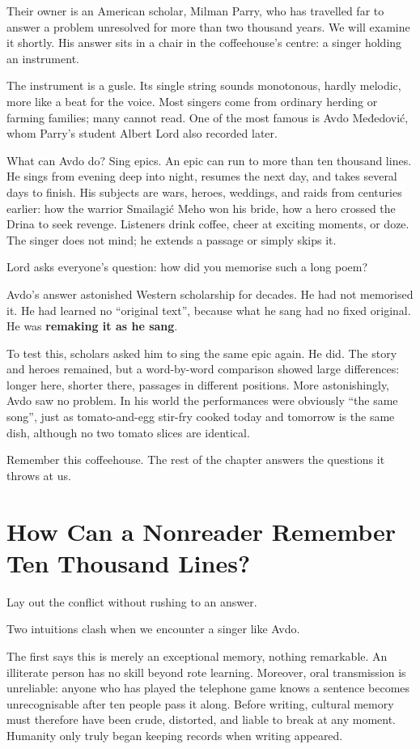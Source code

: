 Their owner is an American scholar, Milman Parry, who has travelled far to answer a problem unresolved for more than two thousand years. We will examine it shortly. His answer sits in a chair in the coffeehouse's centre: a singer holding an instrument.

The instrument is a gusle. Its single string sounds monotonous, hardly melodic, more like a beat for the voice. Most singers come from ordinary herding or farming families; many cannot read. One of the most famous is Avdo Međedović, whom Parry's student Albert Lord also recorded later.

What can Avdo do? Sing epics. An epic can run to more than ten thousand lines. He sings from evening deep into night, resumes the next day, and takes several days to finish. His subjects are wars, heroes, weddings, and raids from centuries earlier: how the warrior Smailagić Meho won his bride, how a hero crossed the Drina to seek revenge. Listeners drink coffee, cheer at exciting moments, or doze. The singer does not mind; he extends a passage or simply skips it.

Lord asks everyone's question: how did you memorise such a long poem?

Avdo's answer astonished Western scholarship for decades. He had not memorised it. He had learned no ``original text'', because what he sang had no fixed original. He was \textbf{remaking it as he sang}.

To test this, scholars asked him to sing the same epic again. He did. The story and heroes remained, but a word-by-word comparison showed large differences: longer here, shorter there, passages in different positions. More astonishingly, Avdo saw no problem. In his world the performances were obviously ``the same song'', just as tomato-and-egg stir-fry cooked today and tomorrow is the same dish, although no two tomato slices are identical.

Remember this coffeehouse. The rest of the chapter answers the questions it throws at us.

\section[Remembering Ten Thousand Lines]{How Can a Nonreader Remember Ten Thousand Lines?}
Lay out the conflict without rushing to an answer.

Two intuitions clash when we encounter a singer like Avdo.

The first says this is merely an exceptional memory, nothing remarkable. An illiterate person has no skill beyond rote learning. Moreover, oral transmission is unreliable: anyone who has played the telephone game knows a sentence becomes unrecognisable after ten people pass it along. Before writing, cultural memory must therefore have been crude, distorted, and liable to break at any moment. Humanity only truly began keeping records when writing appeared.

